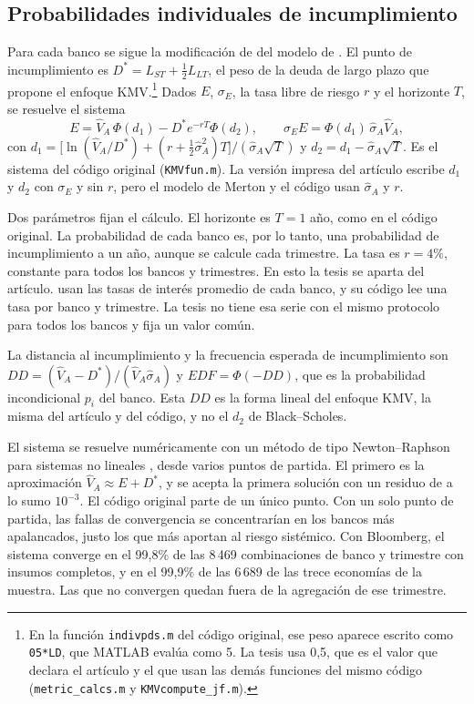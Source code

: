 \subsection{Probabilidades individuales de incumplimiento}

Para cada banco se sigue la modificación de \citet{Kealhofer2000} del modelo de \citet{Merton1974b}. El punto de incumplimiento es $D^{*}=L_{ST}+\tfrac12 L_{LT}$, el peso de la deuda de largo plazo que propone el enfoque KMV.\footnote{En la función \texttt{indivpds.m} del código original, ese peso aparece escrito como \texttt{05*LD}, que MATLAB evalúa como 5. La tesis usa 0,5, que es el valor que declara el artículo y el que usan las demás funciones del mismo código (\texttt{metric\_calcs.m} y \texttt{KMVcompute\_jf.m}).} Dados $E$, $\sigma_E$, la tasa libre de riesgo $r$ y el horizonte $T$, se resuelve el sistema
\[ E=\hat V_A\,\Phi(d_1)-D^{*}e^{-rT}\Phi(d_2), \qquad \sigma_E E=\Phi(d_1)\,\hat\sigma_A\hat V_A, \]
con $d_1=\bigl[\ln(\hat V_A/D^{*})+(r+\tfrac12\hat\sigma_A^2)T\bigr]/(\hat\sigma_A\sqrt T)$ y $d_2=d_1-\hat\sigma_A\sqrt T$. Es el sistema del código original (\texttt{KMVfun.m}). La versión impresa del artículo escribe $d_1$ y $d_2$ con $\sigma_E$ y sin $r$, pero el modelo de Merton y el código usan $\hat\sigma_A$ y $r$.

Dos parámetros fijan el cálculo. El horizonte es $T=1$ año, como en el código original. La probabilidad de cada banco es, por lo tanto, una probabilidad de incumplimiento a un año, aunque se calcule cada trimestre. La tasa es $r=4\%$, constante para todos los bancos y trimestres. En esto la tesis se aparta del artículo. \citet{Chari2024b} usan las tasas de interés promedio de cada banco, y su código lee una tasa por banco y trimestre. La tesis no tiene esa serie con el mismo protocolo para todos los bancos y fija un valor común.

La distancia al incumplimiento y la frecuencia esperada de incumplimiento son $DD=(\hat V_A-D^{*})/(\hat V_A\hat\sigma_A)$ y $EDF=\Phi(-DD)$, que es la probabilidad incondicional $p_i$ del banco. Esta $DD$ es la forma lineal del enfoque KMV, la misma del artículo y del código, y no el $d_2$ de Black--Scholes.

El sistema se resuelve numéricamente con un método de tipo Newton--Raphson para sistemas no lineales \citep{Press2007}, desde varios puntos de partida. El primero es la aproximación $\hat V_A\approx E+D^{*}$, y se acepta la primera solución con un residuo de a lo sumo $10^{-3}$. El código original parte de un único punto. Con un solo punto de partida, las fallas de convergencia se concentrarían en los bancos más apalancados, justo los que más aportan al riesgo sistémico. Con Bloomberg, el sistema converge en el 99,8\% de las 8\,469 combinaciones de banco y trimestre con insumos completos, y en el 99,9\% de las 6\,689 de las trece economías de la muestra. Las que no convergen quedan fuera de la agregación de ese trimestre.

